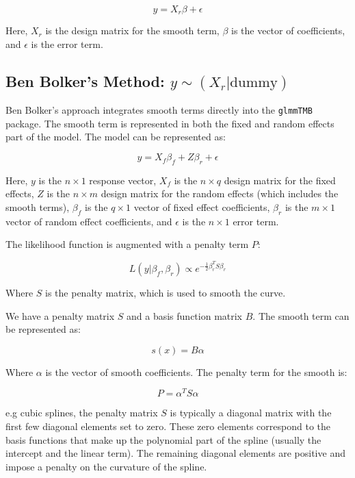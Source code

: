 \begin{equation}
y = X_r \beta + \epsilon
\end{equation}

Here, \(X_r\) is the design matrix for the smooth term, \(\beta\) is the vector of coefficients, and \(\epsilon\) is the error term.

\subsection{Ben Bolker's Method: \(y \sim (X_r | \text{dummy})\)}

Ben Bolker's approach integrates smooth terms directly into the \texttt{glmmTMB} package. The smooth term is represented in both the fixed and random effects part of the model. The model can be represented as:

\begin{equation}
y = X_f \beta_f + Z \beta_r + \epsilon
\end{equation}

Here, \(y\) is the \(n \times 1\) response vector, \(X_f\) is the \(n \times q\) design matrix for the fixed effects, \(Z\) is the \(n \times m\) design matrix for the random effects (which includes the smooth terms), \(\beta_f\) is the \(q \times 1\) vector of fixed effect coefficients, \(\beta_r\) is the \(m \times 1\) vector of random effect coefficients, and \(\epsilon\) is the \(n \times 1\) error term.

The likelihood function is augmented with a penalty term \(P\):

\begin{equation}
L(y | \beta_f, \beta_r) \propto e^{-\frac{1}{2} \beta_r^T S \beta_r}
\end{equation}

Where \(S\) is the penalty matrix, which is used to smooth the curve.

We have a penalty matrix \(S\) and a basis function matrix \(B\). The smooth term can be represented as:

\begin{equation}
s(x) = B \alpha
\end{equation}

Where \( \alpha \) is the vector of smooth coefficients. The penalty term for the smooth is:

\begin{equation}
P = \alpha^T S \alpha
\end{equation}


e.g cubic splines, the penalty matrix \( S \) is typically a diagonal matrix with the first few diagonal elements set to zero. These zero elements correspond to the basis functions that make up the polynomial part of the spline (usually the intercept and the linear term). The remaining diagonal elements are positive and impose a penalty on the curvature of the spline.


